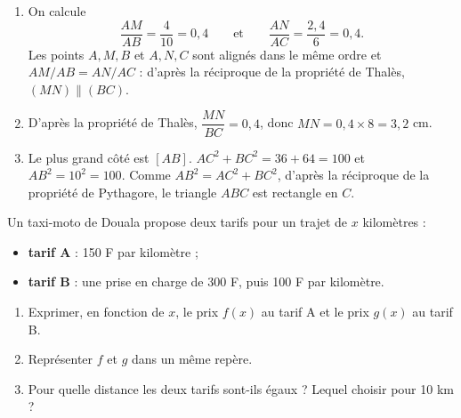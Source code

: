 \documentclass{veritas-epreuve}
\begin{document}
\begin{solution}
\begin{enumerate}
  \item On calcule
  \[ \frac{AM}{AB} = \frac{4}{10} = 0{,}4 \qquad\text{et}\qquad \frac{AN}{AC} = \frac{2{,}4}{6} = 0{,}4. \]
  Les points $A, M, B$ et $A, N, C$ sont alignés dans le même ordre et
  $AM/AB = AN/AC$ : d'après la réciproque de la propriété de Thalès,
  $(MN) \parallel (BC)$. 
  \item D'après la propriété de Thalès, $\dfrac{MN}{BC} = 0{,}4$, donc
  $MN = 0{,}4 \times 8 = 3{,}2$ cm. 
  \item Le plus grand côté est $[AB]$. $AC^2 + BC^2 = 36 + 64 = 100$ et $AB^2 = 10^2 = 100$.
  Comme $AB^2 = AC^2 + BC^2$, d'après la réciproque de la propriété de Pythagore, le triangle
  $ABC$ est rectangle en $C$. 
\end{enumerate}
\end{solution}

Un taxi-moto de Douala propose deux tarifs pour un trajet de $x$ kilomètres :
\begin{itemize}
  \item \textbf{tarif A} : 150 F par kilomètre ;
  \item \textbf{tarif B} : une prise en charge de 300 F, puis 100 F par kilomètre.
\end{itemize}
\begin{enumerate}
  \item Exprimer, en fonction de $x$, le prix $f(x)$ au tarif A et le prix $g(x)$ au tarif B.
  \item Représenter $f$ et $g$ dans un même repère.
  \item Pour quelle distance les deux tarifs sont-ils égaux ? Lequel choisir pour 10 km ?
\end{enumerate}
\end{document}
